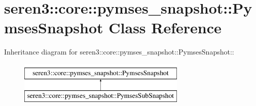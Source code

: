 \hypertarget{classseren3_1_1core_1_1pymses__snapshot_1_1PymsesSnapshot}{
\section{seren3::core::pymses\_\-snapshot::PymsesSnapshot Class Reference}
\label{classseren3_1_1core_1_1pymses__snapshot_1_1PymsesSnapshot}
}
Inheritance diagram for seren3::core::pymses\_\-snapshot::PymsesSnapshot::\begin{figure}[H]
\begin{center}
\leavevmode
\includegraphics[height=2cm]{classseren3_1_1core_1_1pymses__snapshot_1_1PymsesSnapshot}
\end{center}
\end{figure}
